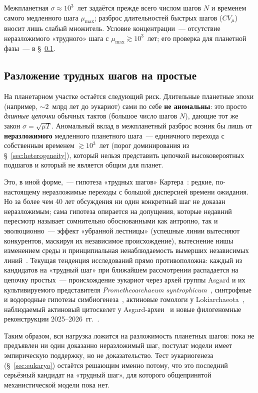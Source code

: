 \documentclass[12pt,a4paper]{article}
\begin{document}
Межпланетная $\sigma\approx10^3$~лет задаётся прежде всего числом шагов $N$ и временем самого медленного шага $\mu_{\max}$; разброс длительностей быстрых шагов ($CV_\mu$) вносит лишь слабый множитель. Условие концентрации~--- отсутствие неразложимого «трудного» шага с $\mu_{\max}\gtrsim10^3$~лет; его проверка для планетной фазы~--- в \S~\ref{sec:planetary_steps}.

\subsection{Разложение трудных шагов на простые}
\label{sec:planetary_steps}

На планетарном участке остаётся следующий риск. Длительные планетные эпохи (например, $\sim 2$~млрд лет до эукариот) сами по себе \textbf{не аномальны}: это просто \emph{длинные цепочки} обычных тактов (большое число шагов $N$), дающие тот же закон $\sigma = \sqrt{\mu T}$. Аномальный вклад в межпланетный разброс возник бы лишь от \textbf{неразложимого} медленного планетного шага~--- единичного перехода с собственным временем $\gtrsim10^3$~лет (порог доминирования из \S~\ref{sec:heterogeneity}), который нельзя представить цепочкой высоковероятных подшагов и который не является общим для планет.

Это, в иной форме,~--- гипотеза «трудных шагов» Картера~\cite{Carter1983}: редкие, по-настоящему неразложимые переходы с большой дисперсией времени ожидания. Но за более чем 40 лет обсуждения ни один конкретный шаг не доказан неразложимым; сама гипотеза опирается на допущения, которые недавний пересмотр называет сомнительно обоснованными как антропно, так и эволюционно~--- эффект «убранной лестницы» (успешные линии вытесняют конкурентов, маскируя их независимое происхождение), вытеснение нишы изменением среды и принципиальная ненаблюдаемость вымерших независимых линий~\cite{Mills2025}. Текущая тенденция исследований прямо противоположна: каждый из кандидатов на «трудный шаг» при ближайшем рассмотрении распадается на цепочку простых~--- происхождение эукариот через архей группы Asgard и их культивируемого представителя \emph{Prometheoarchaeum syntrophicum}~\cite{Spang2015,Zaremba2017,Imachi2020}, синтрофные и водородные гипотезы симбиогенеза~\cite{Martin1998,LopezGarcia2020}, актиновые гомологи у Lokiarchaeota~\cite{Spang2015}, наблюдаемый актиновый цитоскелет у Asgard-археи~\cite{Rodrigues2023} и новые филогеномные реконструкции 2025--2026~гг.~\cite{Tobiasson2026,Speijer2025,BravoArevalo2025}.

Таким образом, вся нагрузка ложится на разложимость планетных шагов: пока не предъявлен ни один доказанно неразложимый шаг, постулат модели имеет эмпирическую поддержку, но не доказательство. Тест эукариогенеза (\S~\ref{sec:eukaryo}) остаётся решающим именно потому, что это последний серьёзный кандидат на «трудный шаг», для которого общепринятой механистической модели пока нет.
\end{document}
